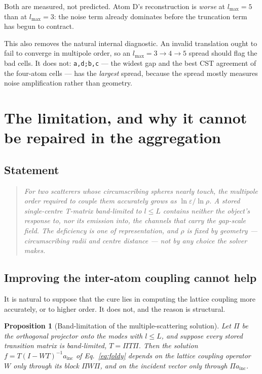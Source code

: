 \documentclass[11pt,a4paper]{article}
\newcommand{\lmax}{\ensuremath{l_{\max}}}
\theoremstyle{plain}
\newtheorem{proposition}{Proposition}
\theoremstyle{definition}
\begin{document}
Both are measured, not predicted. Atom D's reconstruction is \emph{worse} at
$\lmax = 5$ than at $\lmax = 3$: the noise term already dominates before the
truncation term has begun to contract.

This also removes the natural internal diagnostic. An invalid translation ought
to fail to converge in multipole order, so an $\lmax\!=\!3\to4\to5$ spread should
flag the bad cells. It does not: \texttt{a,d;b,c} --- the widest gap and the best
CST agreement of the four-atom cells --- has the \emph{largest} spread, because
the spread mostly measures noise amplification rather than geometry.

\section{The limitation, and why it cannot be repaired in the aggregation}
\label{sec:limit}

\subsection{Statement}

\begin{quote}
\itshape
For two scatterers whose circumscribing spheres nearly touch, the multipole order
required to couple them accurately grows as $\ln\varepsilon / \ln\rho$. A stored
single-centre T-matrix band-limited to $l \le L$ contains neither the object's
response to, nor its emission into, the channels that carry the gap-scale field.
The deficiency is one of representation, and $\rho$ is fixed by geometry ---
circumscribing radii and centre distance --- not by any choice the solver makes.
\end{quote}

\subsection{Improving the inter-atom coupling cannot help}
\label{sec:proof}

It is natural to suppose that the cure lies in computing the lattice coupling
more accurately, or to higher order. It does not, and the reason is structural.

\begin{proposition}[Band-limitation of the multiple-scattering solution]
\label{prop:sandwich}
Let $\Pi$ be the orthogonal projector onto the modes with $l \le L$, and suppose
every stored transition matrix is band-limited, $T = \Pi T \Pi$. Then the solution
$f = T(I - WT)^{-1}a_{\text{inc}}$ of Eq.~\eqref{eq:foldy} depends on the lattice
coupling operator $W$ only through its block $\Pi W \Pi$, and on the incident vector
only through $\Pi a_{\text{inc}}$.
\end{proposition}
\end{document}
